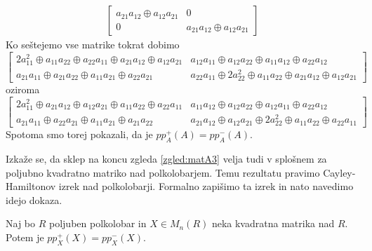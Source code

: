 \documentclass[mat1]{fmfdelo}
\begin{document}
\begin{zgled}
\begin{align*}
\begin{bmatrix}
a_{21}a_{12} \oplus a_{12}a_{21} & 0 \\
0 & a_{21}a_{12} \oplus a_{12}a_{21}
\end{bmatrix}
\end{align*}
Ko seštejemo vse matrike tokrat dobimo $$\begin{bmatrix}
	2a_{11}^2 \oplus a_{11}a_{22} \oplus a_{22}a_{11} \oplus a_{21}a_{12} \oplus a_{12}a_{21} & a_{12}a_{11} \oplus a_{12}a_{22} \oplus a_{11}a_{12} \oplus a_{22}a_{12} \\
	a_{21}a_{11} \oplus a_{21}a_{22} \oplus a_{11}a_{21} \oplus a_{22}a_{21} & a_{22}a_{11} \oplus 2a_{22}^2 \oplus a_{11}a_{22} \oplus a_{21}a_{12} \oplus a_{12}a_{21}
\end{bmatrix}$$ oziroma $$\begin{bmatrix}
2a_{11}^2 \oplus a_{21}a_{12} \oplus a_{12}a_{21} \oplus a_{11}a_{22} \oplus a_{22}a_{11} & a_{11}a_{12} \oplus a_{12}a_{22} \oplus a_{12}a_{11} \oplus a_{22}a_{12} \\
a_{21}a_{11} \oplus a_{22}a_{21} \oplus a_{11}a_{21} \oplus a_{21}a_{22} & a_{21}a_{12} \oplus a_{12}a_{21} \oplus 2a_{22}^2 \oplus a_{11}a_{22} \oplus a_{22}a_{11}
\end{bmatrix}$$
Spotoma smo torej pokazali, da je $pp_A^{+}(A) = pp_A^{-}(A)$.
\end{zgled}

Izkaže se, da sklep na koncu zgleda \ref{zgled:matA3} velja tudi v splošnem za poljubno kvadratno matriko nad polkolobarjem. Temu rezultatu pravimo Cayley-Hamiltonov izrek nad polkolobarji. Formalno zapišimo ta izrek in nato navedimo idejo dokaza.

\begin{izrek}
	Naj bo $R$ poljuben polkolobar in $X\in M_n(R)$ neka kvadratna matrika nad $R$. Potem je $pp_X^{+}(X) = pp_X^{-}(X)$.
\end{izrek}
\end{document}
